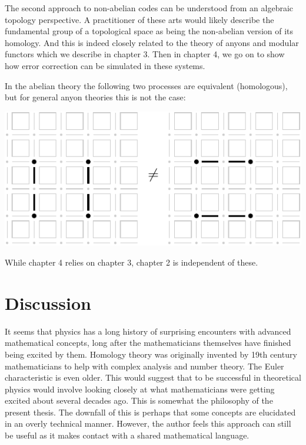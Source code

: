 \documentclass[11pt,oneside]{report}
\newcommand{\danbrowne}[1]{\ \textcolor{red}{\{#1\}}\ }
\begin{document}
The second approach to non-abelian codes can be understood 
from an algebraic topology perspective. 
A practitioner of these arts would likely describe
the fundamental group of a topological space as being the non-abelian 
version of its homology.
And this is indeed closely related to 
the theory of anyons and modular
functors which we describe in chapter 3.
Then in chapter 4, we go on to show how
error correction can be simulated in these systems.

In the abelian theory the following two
processes are equivalent (homologous), but for
general anyon theories this is not the case:
\begin{center}
\includegraphics[width=0.5\columnwidth]{pic-toric-nonab.pdf}
\end{center}

While chapter 4 relies on chapter 3, chapter 2 is independent of these.


\section{Discussion}

It seems that physics has a long history of surprising encounters
with advanced mathematical concepts,
long after the mathematicians
themselves have finished being excited by them.
Homology theory was originally invented by 19th century
mathematicians to help with complex analysis and number theory.
The Euler characteristic is even older.
This would suggest that to be successful in
theoretical physics
would involve looking closely
at what mathematicians were getting excited about several decades ago.
This is somewhat the philosophy of the present thesis.
The downfall of this is perhaps that some concepts are
elucidated in an overly technical manner. However, the
author feels this approach can still be useful as it makes contact
with a shared mathematical language.
\end{document}
